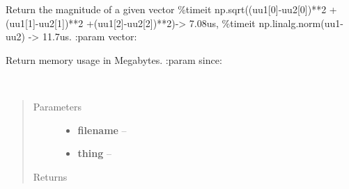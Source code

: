 \documentclass[letterpaper,10pt,english]{sphinxmanual}
\begin{document}

\begin{fulllineitems}
\label{index:aietes.Tools.mag}
Return the magnitude of a given vector
\%timeit np.sqrt((uu1{[}0{]}-uu2{[}0{]})**2 +(uu1{[}1{]}-uu2{[}1{]})**2 +(uu1{[}2{]}-uu2{[}2{]})**2)-\textgreater{} 7.08us,
\%timeit np.linalg.norm(uu1-uu2) -\textgreater{} 11.7us.
:param vector:

\end{fulllineitems}


\begin{fulllineitems}
\label{index:aietes.Tools.memory}
Return memory usage in Megabytes.
:param since:

\end{fulllineitems}


\begin{fulllineitems}
\label{index:aietes.Tools.mkcpickle}~\begin{quote}\begin{description}
\item[{Parameters}] \leavevmode\begin{itemize}
\item {} 
\textbf{filename} -- 

\item {} 
\textbf{thing} -- 

\end{itemize}

\item[{Returns}] \leavevmode


\end{description}\end{quote}

\end{fulllineitems}

\end{document}
